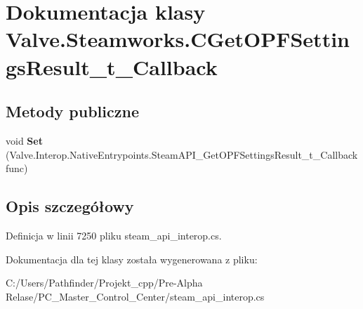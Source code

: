 \hypertarget{class_valve_1_1_steamworks_1_1_c_get_o_p_f_settings_result__t___callback}{}\section{Dokumentacja klasy Valve.\+Steamworks.\+C\+Get\+O\+P\+F\+Settings\+Result\+\_\+t\+\_\+\+Callback}
\label{class_valve_1_1_steamworks_1_1_c_get_o_p_f_settings_result__t___callback}
\subsection*{Metody publiczne}
\begin{DoxyCompactItemize}
\item 
\mbox{\label{class_valve_1_1_steamworks_1_1_c_get_o_p_f_settings_result__t___callback_af6be5e6145622499e151526121ed0646}} 
void {\bfseries Set} (Valve.\+Interop.\+Native\+Entrypoints.\+Steam\+A\+P\+I\+\_\+\+Get\+O\+P\+F\+Settings\+Result\+\_\+t\+\_\+\+Callback func)
\end{DoxyCompactItemize}


\subsection{Opis szczegółowy}


Definicja w linii 7250 pliku steam\+\_\+api\+\_\+interop.\+cs.



Dokumentacja dla tej klasy została wygenerowana z pliku\+:\begin{DoxyCompactItemize}
\item 
C\+:/\+Users/\+Pathfinder/\+Projekt\+\_\+cpp/\+Pre-\/\+Alpha Relase/\+P\+C\+\_\+\+Master\+\_\+\+Control\+\_\+\+Center/steam\+\_\+api\+\_\+interop.\+cs\end{DoxyCompactItemize}
